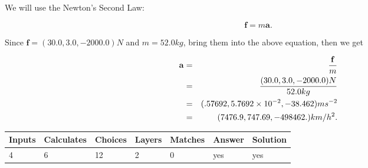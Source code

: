 \documentclass[12pt]{article}
\begin{document}
 
\noindent{}
 
 
 
 
 
 
\noindent{}
 
 

We will use the Newton's Second Law:
 
\[
\mathbf{f}=m\mathbf{a}.
\]
 
Since $\mathbf{f}=( %
30.0,  %
3.0,  %
-2000.0 )N$
and $m= %
52.0 kg$, bring them into the above equation, then we get
 
\begin{eqnarray*}
\mathbf{a}&=&\frac{\mathbf{f}}m  \\
&=&\frac{(
30.0 ,
3.0 ,
-2000.0 )N
}{ %
52.0 kg}  \\
&=&(
.57692 ,
5.7692 \times 10^{-2},
-38.462
)ms^{-2} \\
&=&(
7476.9 ,
747.69 ,
-498462.
)km/h^2.
\end{eqnarray*}
 
 
 
\noindent{}
 
 

 
 
\vspace{0.3in}
   
   
   
   
\noindent\begin{tabular}{|l|l|l|l|l|l|l|}
 \hline
Inputs & Calculates & Choices & Layers & Matches & Answer & Solution \\ \hline
           4 & 
           6 & 
          12
  & 
           2 & 
           0 & 
  yes & 
  yes 
  \\ \hline
 \end{tabular}
   
   
   
   
\noindent{}
   
   
  
\end{document}
